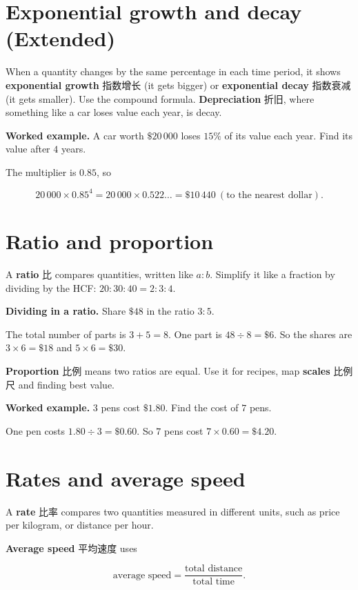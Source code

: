 \documentclass[11pt]{article}
\begin{document}
\section*{Exponential growth and decay (Extended)}

When a quantity changes by the same percentage in each time period, it shows \textbf{exponential growth} 指数增长 (it gets bigger) or \textbf{exponential decay} 指数衰减 (it gets smaller). Use the compound formula. \textbf{Depreciation} 折旧, where something like a car loses value each year, is decay.

\textbf{Worked example.} A car worth $\$20\,000$ loses $15\%$ of its value each year. Find its value after $4$ years.

The multiplier is $0.85$, so

\[
20\,000 \times 0.85^{4} = 20\,000 \times 0.522\ldots = \$10\,440 \ (\text{to the nearest dollar}).
\]

\section*{Ratio and proportion}

A \textbf{ratio} 比 compares quantities, written like $a:b$. Simplify it like a fraction by dividing by the HCF: $20:30:40 = 2:3:4$.

\textbf{Dividing in a ratio.} Share $\$48$ in the ratio $3:5$.

The total number of parts is $3 + 5 = 8$. One part is $48 \div 8 = \$6$. So the shares are $3 \times 6 = \$18$ and $5 \times 6 = \$30$.

\textbf{Proportion} 比例 means two ratios are equal. Use it for recipes, map \textbf{scales} 比例尺 and finding best value.

\textbf{Worked example.} $3$ pens cost $\$1.80$. Find the cost of $7$ pens.

One pen costs $1.80 \div 3 = \$0.60$. So $7$ pens cost $7 \times 0.60 = \$4.20$.

\section*{Rates and average speed}

A \textbf{rate} 比率 compares two quantities measured in different units, such as price per kilogram, or distance per hour.

\textbf{Average speed} 平均速度 uses

\[
\text{average speed} = \frac{\text{total distance}}{\text{total time}}.
\]
\end{document}
